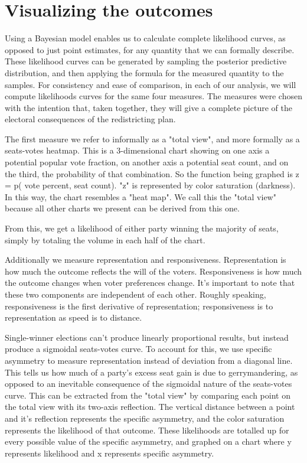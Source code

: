 \documentclass[preprint,12pt]{article}
\begin{document}
\clearpage

\section{Visualizing the outcomes}

Using a Bayesian model enables us to calculate complete likelihood curves, as opposed to just point estimates, for any quantity that we can formally describe.  These likelihood curves can be generated by sampling the posterior predictive distribution, and then applying the formula for the measured quantity to the samples.  For consistency and ease of comparison, in each of our analysis, we will compute likelihoods curves for the same four measures.  The measures were chosen with the intention that, taken together, they will give a complete picture of the electoral consequences of the redistricting plan.

The first measure we refer to informally as a "total view", and more formally as a seats-votes heatmap. This is a 3-dimensional chart showing on one axis a potential popular vote fraction, on another axis a potential seat count, and on the third, the probability of that combination.  So the function being graphed is z = p( vote percent, seat count). "z" is represented by color saturation (darkness).  In this way, the chart resembles a "heat map". We call this the "total view" because all other charts we present can be derived from this one.

From this, we get a likelihood of either party winning the majority of seats, simply by totaling the volume in each half of the chart. 

Additionally we measure representation and responsiveness.  Representation is how much the outcome reflects the will of the voters.  Responsiveness is how much the outcome changes when voter preferences change.  It's important to note that these two components are independent of each other.  Roughly speaking, responsiveness is the first derivative of representation; responsiveness is to representation as speed is to distance.

Single-winner elections can't produce linearly proportional results, but instead produce a sigmoidal seats-votes curve.  To account for this, we use specific asymmetry to measure representation instead of deviation from a diagonal line.  This tells us how much of a party's excess seat gain is due to gerrymandering, as opposed to an inevitable consequence of  the sigmoidal nature of the seats-votes curve.  This can be extracted from the "total view" by comparing each point on the total view with its two-axis reflection.  The vertical distance between a point and it's reflection represents the specific asymmetry, and the color saturation represents the likelihood of that outcome.  These likelihoods are totalled up for every possible value of the specific asymmetry, and graphed on a chart where y represents likelihood and x represents specific asymmetry.
\end{document}
